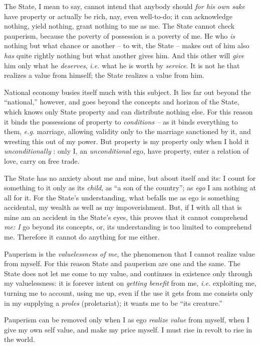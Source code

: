 The State, I mean to say, cannot intend that anybody should \textit{for his 
own sake} have property or actually be rich, nay, even well-to-do; it can 
acknowledge nothing, yield nothing, grant nothing to me as me. The State 
cannot check pauperism, because the poverty of possession is a poverty of me. 
He who \textit{is} nothing but what chance or another -- to wit, the State -- 
makes out of him also \textit{has} quite rightly nothing but what another 
gives him. And this other will \textit{give} him only what he 
\textit{deserves}, \textit{i.e.} what he is worth by \textit{service}. It is 
not he that realizes a value from himself; the State realizes a value from 
him.

National economy busies itself much with this subject. It lies far out beyond 
the ``national,'' however, and goes beyond the concepts and horizon of the 
State, which knows only State property and can distribute nothing else. For 
this reason it binds the possessions of property to \textit{conditions --} as 
it binds everything to them, \textit{e.g.} marriage, allowing validity only 
to the marriage sanctioned by it, and wresting this out of my power. But 
property is my property only when I hold it \textit{unconditionally} : only I, 
an \textit{unconditional} ego, have property, enter a relation of love, carry 
on free trade.

The State has no anxiety about me and mine, but about itself and its: I count 
for something to it only as its \textit{child}, as ``a son of the country''; 
as \textit{ego} I am nothing at all for it. For the State's understanding, 
what befalls me as ego is something accidental, my wealth as well as my 
impoverishment. But, if I with all that is mine am an accident in the State's 
eyes, this proves that it cannot comprehend \textit{me: I} go beyond its 
concepts, or, its understanding is too limited to comprehend me. Therefore it 
cannot do anything for me either.

Pauperism is the \textit{valuelessness of me}, the phenomenon that I cannot 
realize value from myself. For this reason State and pauperism are one and the 
same. The State does not let me come to my value, and continues in existence 
only through my valuelessness: it is forever intent on \textit{getting 
benefit} from me, \textit{i.e.} exploiting me, turning me to account, using me 
up, even if the use it gets from me consists only in my supplying a 
\textit{proles} (proletariat); it wants me to be ``its creature.''

Pauperism can be removed only when I as ego \textit{realize value} from 
myself, when I give my own self value, and make my price myself. I must rise 
in revolt to rise in the world.

